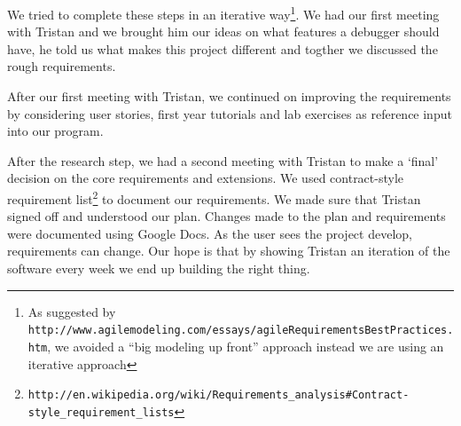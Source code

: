 \documentclass[11pt, a4paper]{article}
\begin{document}
We tried to complete these steps in an iterative way\footnote{As suggested by {{\tt{http://www.agilemodeling.com/essays/agileRequirementsBestPractices.htm}}}, we avoided a ``big modeling up front'' approach instead we are using an iterative approach}. We had our first meeting with Tristan 
and we brought him our ideas on what features a debugger should have, he told us what makes this project different and togther we discussed the rough requirements.

After our first meeting with Tristan, we continued on improving the requirements by considering user stories, first year tutorials and lab exercises as reference input into our program.

After the research step, we had a second meeting with Tristan to make a `final' decision on the core requirements and extensions. We used contract-style requirement list\footnote{\tt{http://en.wikipedia.org/wiki/Requirements\_analysis\#Contract-style\_requirement\_lists}} to document our requirements. We made sure that Tristan signed off and understood our plan. Changes made to the plan and requirements were documented using Google Docs. As the user sees the project develop, requirements can change. Our hope is that by showing Tristan an iteration of the software every week we end up building the right thing.
\end{document}
